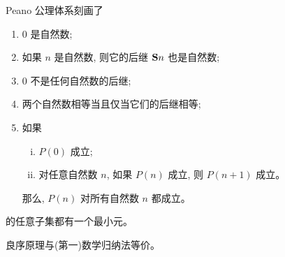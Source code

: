 \begin{frame}{}
  \begin{center}
    Peano 公理体系刻画了
  \end{center}

  \begin{definition}
    \begin{enumerate}[(1)]
      \setlength{\itemsep}{6pt}
      \item 0 是自然数;
      \item 如果 $n$ 是自然数, 则它的后继 ${\bf S}n$ 也是自然数;
      \item 0 不是任何自然数的后继;
      \item 两个自然数相等当且仅当它们的后继相等;
      \item {} 如果
        \begin{enumerate}[(i)]
          \setlength{\itemsep}{8pt}
          \item $P(0)$ 成立;
          \item 对任意自然数 $n$, 如果 $P(n)$ 成立, 则 $P(n+1)$ 成立。
        \end{enumerate}
        那么, $P(n)$ 对所有自然数 $n$ 都成立。
    \end{enumerate}
  \end{definition}
\end{frame}

\begin{frame}{}
  \begin{definition}
    的任意子集都有一个最小元。
  \end{definition}
\end{frame}

\begin{frame}{}
  \begin{theorem}{}
    良序原理与(第一)数学归纳法等价。
  \end{theorem}
\end{frame}


